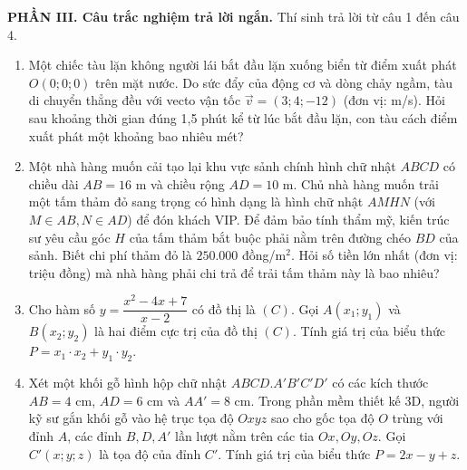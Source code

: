 \documentclass[12pt]{article}
\begin{document}
	\noindent\textbf{PHẦN III. Câu trắc nghiệm trả lời ngắn.} Thí sinh trả lời từ câu 1 đến câu 4.
	\vspace{2mm}
	
	\begin{enumerate}[label=\textbf{Câu \arabic*.}, leftmargin=*]
		
		\item Một chiếc tàu lặn không người lái bắt đầu lặn xuống biển từ điểm xuất phát $O(0; 0; 0)$ trên mặt nước. Do sức đẩy của động cơ và dòng chảy ngầm, tàu di chuyển thẳng đều với vecto vận tốc $\vec{v} = (3; 4; -12)$ (đơn vị: m/s). Hỏi sau khoảng thời gian đúng 1,5 phút kể từ lúc bắt đầu lặn, con tàu cách điểm xuất phát một khoảng bao nhiêu mét?
		\vspace{4mm}
		
		\item Một nhà hàng muốn cải tạo lại khu vực sảnh chính hình chữ nhật $ABCD$ có chiều dài $AB = 16$ m và chiều rộng $AD = 10$ m. Chủ nhà hàng muốn trải một tấm thảm đỏ sang trọng có hình dạng là hình chữ nhật $AMHN$ (với $M \in AB, N \in AD$) để đón khách VIP. Để đảm bảo tính thẩm mỹ, kiến trúc sư yêu cầu góc $H$ của tấm thảm bắt buộc phải nằm trên đường chéo $BD$ của sảnh. Biết chi phí thảm đỏ là $250.000$ đồng/m$^2$. Hỏi số tiền lớn nhất (đơn vị: triệu đồng) mà nhà hàng phải chi trả để trải tấm thảm này là bao nhiêu?
		\vspace{4mm}
		
		\item Cho hàm số $y = \dfrac{x^2 - 4x + 7}{x - 2}$ có đồ thị là $(C)$. Gọi $A(x_1; y_1)$ và $B(x_2; y_2)$ là hai điểm cực trị của đồ thị $(C)$. Tính giá trị của biểu thức $P = x_1 \cdot x_2 + y_1 \cdot y_2$.
		\vspace{4mm}
		
		\item Xét một khối gỗ hình hộp chữ nhật $ABCD.A'B'C'D'$ có các kích thước $AB = 4$ cm, $AD = 6$ cm và $AA' = 8$ cm. Trong phần mềm thiết kế 3D, người kỹ sư gắn khối gỗ vào hệ trục tọa độ $Oxyz$ sao cho gốc tọa độ $O$ trùng với đỉnh $A$, các đỉnh $B, D, A'$ lần lượt nằm trên các tia $Ox, Oy, Oz$. Gọi $C'(x; y; z)$ là tọa độ của đỉnh $C'$. Tính giá trị của biểu thức $P = 2x - y + z$.
		
	\end{enumerate}
	
\end{document}
